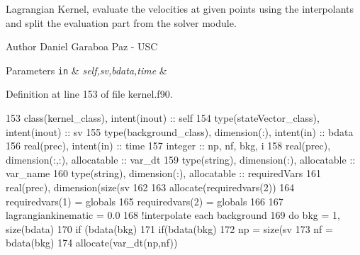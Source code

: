 Lagrangian Kernel, evaluate the velocities at given points using the interpolants and split the evaluation part from the solver module. 

\begin{DoxyAuthor}{Author}
Daniel Garaboa Paz -\/ U\+SC 
\end{DoxyAuthor}

\begin{DoxyParams}[1]{Parameters}
\mbox{\tt in}  & {\em self,sv,bdata,time} & \\
\hline
\end{DoxyParams}


Definition at line 153 of file kernel.\+f90.


\begin{DoxyCode}
153     \textcolor{keywordtype}{class}(kernel\_class), \textcolor{keywordtype}{intent(inout)} :: self
154     \textcolor{keywordtype}{type}(stateVector\_class), \textcolor{keywordtype}{intent(inout)} :: sv
155     \textcolor{keywordtype}{type}(background\_class), \textcolor{keywordtype}{dimension(:)}, \textcolor{keywordtype}{intent(in)} :: bdata
156     \textcolor{keywordtype}{real(prec)}, \textcolor{keywordtype}{intent(in)} :: time
157     \textcolor{keywordtype}{integer} :: np, nf, bkg, i
158     \textcolor{keywordtype}{real(prec)}, \textcolor{keywordtype}{dimension(:,:)}, \textcolor{keywordtype}{allocatable} :: var\_dt
159     \textcolor{keywordtype}{type}(string), \textcolor{keywordtype}{dimension(:)}, \textcolor{keywordtype}{allocatable} :: var\_name
160     \textcolor{keywordtype}{type}(string), \textcolor{keywordtype}{dimension(:)}, \textcolor{keywordtype}{allocatable} :: requiredVars
161     \textcolor{keywordtype}{real(prec)}, \textcolor{keywordtype}{dimension(size(sv%
162 
163     \textcolor{keyword}{allocate}(requiredvars(2))
164     requiredvars(1) = globals%
165     requiredvars(2) = globals%
166 
167     lagrangiankinematic = 0.0
168     \textcolor{comment}{!interpolate each background}
169     \textcolor{keywordflow}{do} bkg = 1, \textcolor{keyword}{size}(bdata)
170         \textcolor{keywordflow}{if} (bdata(bkg)%
171             \textcolor{keywordflow}{if}(bdata(bkg)%
172                 np = \textcolor{keyword}{size}(sv%
173                 nf = bdata(bkg)%
174                 \textcolor{keyword}{allocate}(var\_dt(np,nf))
}
\end{DoxyCode}
